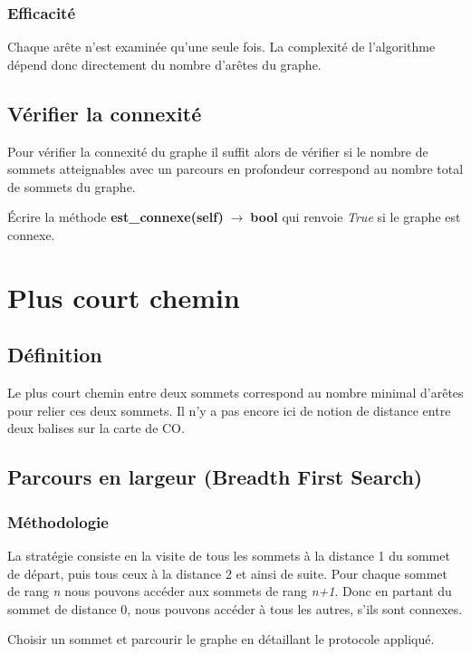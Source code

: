 \documentclass[a4paper,11pt]{article}
\begin{document}
\begin{Form}
\subsubsection{Efficacité}
Chaque arête n'est examinée qu'une seule fois. La complexité de l'algorithme dépend donc directement du nombre d'arêtes du graphe.
\subsection{Vérifier la connexité}
Pour vérifier la connexité du graphe il suffit alors de vérifier si le nombre de sommets atteignables avec un parcours en profondeur correspond au nombre total de sommets du graphe.
\begin{activite}
Écrire la méthode \textbf{est\_connexe(self)$\;\rightarrow\;$bool} qui renvoie \emph{True} si le graphe est connexe.
\end{activite}
\section{Plus court chemin}
\subsection{Définition}
Le plus court chemin entre deux sommets correspond au nombre minimal d'arêtes pour relier ces deux sommets. Il n'y a pas encore ici de notion de distance entre deux balises sur la carte de CO.
\subsection{Parcours en largeur (Breadth First Search)}
\subsubsection{Méthodologie}
La stratégie consiste en la visite de tous les sommets à la distance 1 du sommet de départ, puis tous ceux à la distance 2 et ainsi de suite. Pour chaque sommet de rang \emph{n} nous pouvons accéder aux sommets de rang \emph{n+1}. Donc en partant du sommet de distance 0, nous pouvons accéder à tous les autres, s'ils sont connexes.
\begin{activite}
Choisir un sommet et parcourir le graphe  en détaillant le protocole appliqué.
\end{activite}

\end{Form}
\end{document}
